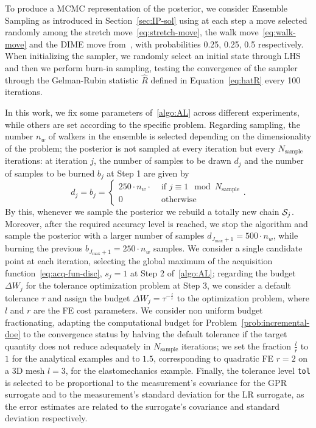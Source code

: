 To produce a MCMC representation of the posterior, we consider Ensemble Sampling as introduced in Section~\ref{sec:IP-sol} using at each step a move selected randomly among the stretch move~\eqref{eq:stretch-move}, the walk move~\eqref{eq:walk-move} and the DIME move from~\cite{Boehl}, with probabilities 0.25, 0.25, 0.5 respectively. 
When initializing the sampler, we randomly select an initial state through LHS and then we perform burn-in sampling, testing the convergence of the sampler through the Gelman-Rubin statistic $\hat R$ defined in Equation~\eqref{eq:hatR} every 100 iterations.
\medskip

In this work, we fix some parameters of~\ref{algo:AL} across different experiments, while others are set according to the specific problem.
Regarding sampling, the number $n_w$ of walkers in the ensemble is selected depending on the dimensionality of the problem; the posterior is not sampled at every iteration but every $N_{\text{sample}}$ iterations: at iteration $j$, the number of samples to be drawn $d_j$ and the number of samples to be burned $b_j$ at Step 1 are given by
\[
d_j = b_j = \begin{cases}
    250 \cdot n_w \cdot  & \text{ if } j \equiv 1 \mod N_{\text{sample}} \\
    0 & \text{ otherwise}
\end{cases}.
\]
By this, whenever we sample the posterior we rebuild a totally new chain $\mathcal S_j$. 
Moreover, after the required accuracy level is reached, we stop the algorithm and sample the posterior with a larger number of samples $d_{J_{\max} +1} = 500 \cdot n_w$, while burning the previous $b_{J_{\max} +1} = 250 \cdot n_w$ samples.\newline
We consider a single candidate point at each iteration, selecting the global maximum of the acquisition function~\eqref{eq:acq-fun-disc}, $s_j = 1$ at Step 2 of~\ref{algo:AL}; regarding the budget $\Delta W_j$ for the tolerance optimization problem at Step 3, we consider a default tolerance $\tau$ and assign the budget $\Delta W_j = \tau^{-\frac{l}{r}}$ to the optimization problem, where $l$ and $r$ are the FE cost parameters.
We consider non uniform budget fractionating, adapting the computational budget for Problem~\eqref{prob:incremental-doe} to the convergence status by halving the default tolerance if the target quantity does not reduce adequately in $N_\text{sample}$ iterations; we set the fraction $\frac{l}{r}$ to $1$ for the analytical examples and to $1.5$, corresponding to quadratic FE $r=2$ on a 3D mesh $l=3$, for the elastomechanics example.  \newline
Finally, the tolerance level \texttt{tol} is selected to be proportional to the measurement's covariance for the GPR surrogate and to the measurement's standard deviation for the LR surrogate, as the error estimates are related to the surrogate's covariance and standard deviation respectively.\medskip

